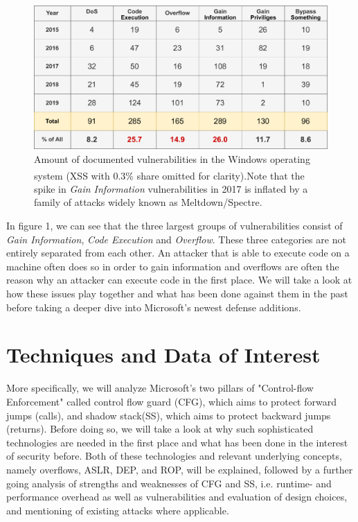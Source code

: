 \documentclass[10pt,twocolumn,a4paper]{article}
\begin{document}
\begin{figure}[h]
\centering
\includegraphics[keepaspectratio,width=\linewidth]{fig/cve}
\caption{Amount of documented vulnerabilities in the Windows operating system (XSS with 0.3\% share omitted for clarity)\textsuperscript{\cite{CVE}}.\newline Note that the spike in \emph{Gain Information} vulnerabilities in 2017 is inflated by a family of attacks widely known as Meltdown/Spectre.}
\end{figure}
\newpage
In figure 1, we can see that the three largest groups of vulnerabilities consist of \emph{Gain Information}, \emph{Code Execution} and \emph{Overflow}.
These three categories are not entirely separated from each other.
An attacker that is able to execute code on a machine often does so in order to gain information and overflows are often the reason why an attacker can execute code in the first place.
We will take a look at how these issues play together and what has been done against them in the past before taking a deeper dive into Microsoft's newest defense additions.

\section{Techniques and Data of Interest}
More specifically, we will analyze Microsoft's two pillars of "Control-flow Enforcement" called control flow guard (CFG), which aims to protect forward jumps (calls), and shadow stack(SS), which aims to protect backward jumps (returns).  Before doing so, we will take a look at why such sophisticated technologies are needed in the first place and what has been done in the interest of security before.
Both of these technologies and relevant underlying concepts, namely overflows, ASLR, DEP, and ROP, will be explained, followed by a further going analysis of  strengths and weaknesses of CFG and SS, i.e. runtime- and performance overhead as well as vulnerabilities and evaluation of design choices,  and mentioning of existing attacks where applicable.
\end{document}

